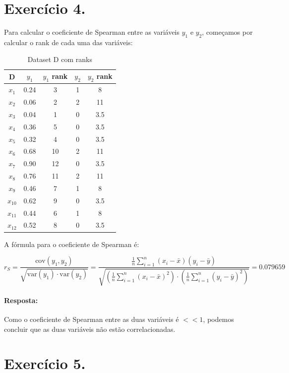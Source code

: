 \documentclass{article}
\begin{document}
\newpage

\section{Exercício 4.}

Para calcular o coeficiente de Spearman entre as variáveis $y_1$ e $y_2$, começamos por calcular o rank de cada uma das variáveis:

\begin{table}[h!]
  \centering
  \begin{tabular}{|c|c|c|c|c|}
    \hline
    D      & $y_1$ & $y_1$ rank & $y_2$ & $y_2$ rank \\ \hline
    $x_1$  & 0.24  & 3          & 1     & 8          \\ \hline
    $x_2$  & 0.06  & 2          & 2     & 11          \\ \hline
    $x_3$  & 0.04  & 1          & 0     & 3.5         \\ \hline
    $x_4$  & 0.36  & 5          & 0     & 3.5          \\ \hline
    $x_5$  & 0.32  & 4          & 0     & 3.5          \\ \hline
    $x_6$  & 0.68  & 10          & 2     & 11          \\ \hline
    $x_7$  & 0.90  & 12          & 0     & 3.5          \\ \hline
    $x_8$  & 0.76  & 11          & 2     & 11          \\ \hline
    $x_9$  & 0.46  & 7          & 1     & 8         \\ \hline
    $x_{10}$ & 0.62  & 9          & 0     & 3.5          \\ \hline
    $x_{11}$ & 0.44  & 6          & 1     & 8          \\ \hline
    $x_{12}$ & 0.52  & 8          & 0     & 3.5          \\ \hline
  \end{tabular}
  \caption{Dataset D com ranks}
  \label{tab:datasetD_ranks}
\end{table}

A fórmula para o coeficiente de Spearman é:

\[ r_S = \frac{\text{cov}(y_1, y_2)}{\sqrt{\text{var}(y_1)\cdot \text{var}(y_2)}} = \frac{\frac{1}{n} \sum_{i=1}^{n} (x_i - \bar{x})(y_i - \bar{y})}{ \sqrt{\left(\frac{1}{n} \sum_{i=1}^{n} (x_i - \bar{x})^2 \right) \cdot \left(\frac{1}{n} \sum_{i=1}^{n} (y_i - \bar{y})^2 \right)}} = 0.079659 \]

\paragraph{Resposta: }Como o coeficiente de Spearman entre as duas variáveis é $<< 1$, podemos concluir que as duas variáveis não estão correlacionadas.

\section{Exercício 5.}
\end{document}
